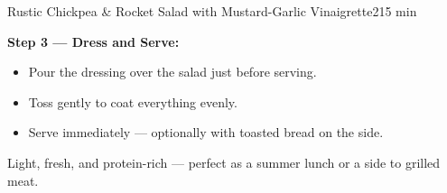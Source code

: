\begin{recipebox}{Rustic Chickpea \& Rocket Salad with Mustard-Garlic Vinaigrette}{2}{15 min}
\begin{method}
    \vspace{0.8em}

    \item \textbf{Step 3 — Dress and Serve:}
    \begin{itemize}[leftmargin=2em]
      \item Pour the dressing over the salad just before serving.
      \item Toss gently to coat everything evenly.
      \item Serve immediately — optionally with toasted bread on the side.
    \end{itemize}

  \end{method}

  \begin{notes}
    Light, fresh, and protein-rich — perfect as a summer lunch or a side to grilled meat.
  \end{notes}

\end{recipebox}